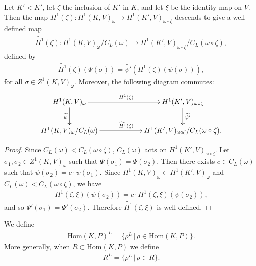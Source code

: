 \begin{lemma} Let $K' < K'$, let $\zeta$ the inclusion of $K'$ in $K$, and let $\xi$ be the identity map on $V$. Then the map $H^1(\zeta):H^1(K, V)_\omega \rightarrow H^1(K', V)_{\omega\circ\zeta}$ descends to give a well-defined map
	\begin{align*}
		\widetilde{H^1}(\zeta): H^1(K, V)_\omega/C_L(\omega) \rightarrow H^1(K', V)_{\omega\circ\zeta}/C_L(\omega\circ \zeta),
	\end{align*}
defined by
	\begin{align*}
		\widetilde{H^1}(\zeta)(\Psi(\sigma)) = \widetilde{\psi'}\left(H^1(\zeta)(\psi(\sigma))\right),
	\end{align*}
for all $\sigma\in Z^1(K, V)_\omega$.
Moreover, the following diagram commutes:
  \begin{align*}
    \xymatrix@C=60pt{
		H^1(K, V)_\omega \ar[r]^{H^1(\zeta)} \ar[d]_{\widetilde{\psi}} & H^1(K', V)_{\omega\circ\zeta} \ar[d]^{\widetilde{\psi'}} \\
		H^1(K, V)_\omega/C_L(\omega) \ar[r]^{\widetilde{H^1}(\zeta)} & {H^1(K', V)_{\omega\circ\zeta}/C_L(\omega\circ\zeta)}.
    }
  \end{align*}
\end{lemma}
\begin{proof}
Since $C_L(\omega) < C_L(\omega\circ\zeta)$, $C_L(\omega)$ acts on $H^1(K', V)_{\omega\circ\zeta}$. 
	Let $\sigma_1, \sigma_2 \in Z^1(K, V)_\omega$ such that $\Psi(\sigma_1) = \Psi(\sigma_2)$. Then there exists $c \in C_L(\omega)$ such that $\psi(\sigma_2) = c \cdot \psi(\sigma_1)$. Since $H^1(K, V)_\omega \subset H^1(K', V)_\omega$ and $C_L(\omega) < C_L(\omega\circ\zeta)$, we have
	\begin{align*}
		H^1(\zeta, \xi)\left(\psi(\sigma_2)\right) = c \cdot H^1(\zeta, \xi)\left(\psi(\sigma_2)\right),
	\end{align*}
	and so $\Psi'(\sigma_1) = \Psi'(\sigma_2)$. Therefore $\widetilde{H^1}(\zeta, \xi)$ is well-defined.
\end{proof}

\begin{definition} We define
	\begin{align*}
		\mathrm{Hom}(K, P)^L = \{\rho^L\,|\,\rho \in \mathrm{Hom}(K, P)\}.
	\end{align*}
	More generally, when $R \subset \mathrm{Hom}(K, P)$ we define
	\begin{align*}
		R^L = \{\rho^L\,|\,\rho \in R\}.
	\end{align*}
\end{definition}

